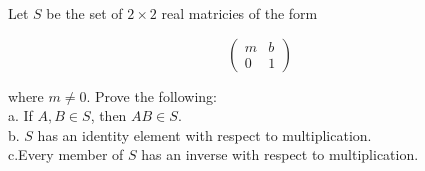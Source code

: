 Let $S$ be the set of $2\times2$ real matricies of the form

$$\left ( \begin{array}{cc} m & b\\ 0 & 1 \end{array} \right )$$

where $m\neq0$. Prove the following:\\

a. If $A, B\in S$, then $AB\in S$.\\

b. $S$ has an identity element with respect to multiplication.\\

c.Every member of $S$ has an inverse with respect to multiplication.\\\\

